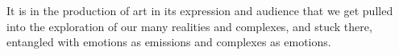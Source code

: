 

It is in the production of art in its expression and audience that we
get pulled into the exploration of our many realities and complexes,
and stuck there, entangled with emotions as emissions and complexes as
emotions.

\bye
